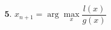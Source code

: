 \documentclass[preview]{standalone}
\begin{document}
\begin{align*}
\textbf{5. }x_{n+1}= \arg\max_{x}\dfrac{l(x)}{g(x)}
\end{align*}
\end{document}
